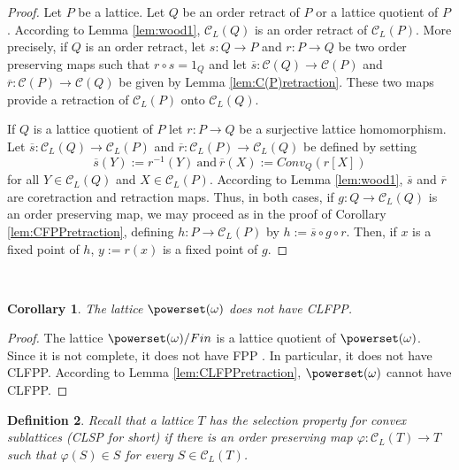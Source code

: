 \documentclass[12pt]{amsart}
\newtheorem{definition}{{\bf Definition}}[section]
\newtheorem{corollary}[definition]{{\bf Corollary}}
\begin{document}
\begin{proof} 
Let $P$ be a lattice.  Let $Q$ be an order retract of $P$ or a lattice
quotient of $P$. According to Lemma \ref{lem:wood1}, $\mathcal{C}_{
L}(Q)$ is an order retract of $\mathcal{C}_{ L}(P)$. More precisely,
if $Q$ is an order retract, let $s: Q \rightarrow P$ and
$r:P\rightarrow Q$ be two order preserving maps such that $r\circ s
=1_{Q}$ and let $\overline s: \mathcal C(Q)
\rightarrow \mathcal C(P)$ and $\overline r:\mathcal C(P)\rightarrow
\mathcal C(Q)$ be given by Lemma \ref {lem:C(P)retraction}.  These two
maps provide a retraction of $\mathcal{C}_L(P)$ onto $\mathcal{C}_{
L}(Q)$.

If $Q$ is a lattice quotient of $P$ let $r: P\rightarrow Q$ be a
surjective lattice homomorphism. Let $\overline s: \mathcal{C}_{
L}(Q)\rightarrow \mathcal{C}_{ L}(P)$ and $\overline r: \mathcal{C}_{
L}( P)\rightarrow \mathcal{C}_{ L}(Q)$ be defined by setting
$$\overline s(Y):=r^{-1}(Y) \ \text{and} \ \overline
r(X):=Conv_Q(r[X])$$ for all $Y\in \mathcal{C}_{ L}(Q)$ and $X\in
\mathcal{C}_L (P)$. According to Lemma \ref{lem:wood1}, $\overline s$
and $\overline r$ are coretraction and retraction maps. Thus, in both
cases, if $g: Q \rightarrow \mathcal{C}_{ L}(Q)$ is an order
preserving map, we may proceed as in the proof of Corollary
\ref{lem:CFPPretraction}, defining $h: P\rightarrow \mathcal{C}_{
L}(P)$ by $h:= \overline s\circ g\circ r $.  Then, if $x$ is a fixed
point of $h$, $y:=r(x)$ is a fixed point of $g$.  \end{proof}\\
 
\begin{corollary}\label {failureCLFPP} 
The lattice $\powerset (\omega)$ does not have CLFPP.
\end{corollary}

\begin{proof}
The lattice $\powerset (\omega)/Fin$ is a lattice quotient of
$\powerset (\omega)$.  Since it is not complete, it does not have FPP
\cite{davis}. In particular, it does not have CLFPP.  According to
Lemma \ref{lem:CLFPPretraction}, $\powerset (\omega)$ cannot have
CLFPP. \end{proof}

\begin{definition}
Recall that a lattice $T$ has the \emph{selection property for convex
sublattices} (CLSP for short) if there is an order preserving map
$\varphi: \mathcal{C}_{ L}(T)\rightarrow T$ such that $\varphi(S)\in
S$ for every $S\in \mathcal{C}_{ L}(T)$.  
\end{definition}
\end{document}
